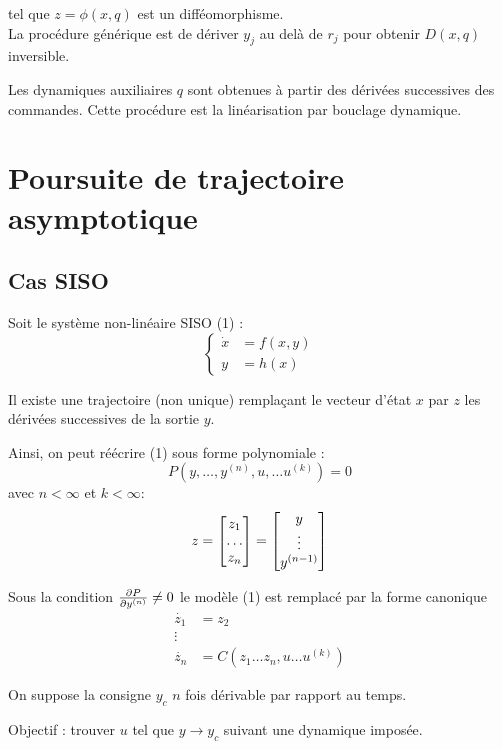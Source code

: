 \documentclass[main.tex]{subfiles}
\begin{document}
tel que $z=\phi(x,q)$ est un difféomorphisme.\\

La procédure générique est de dériver $y_j$ au delà de $r_j$ pour obtenir $D(x,q)$ inversible.

Les dynamiques auxiliaires $q$ sont obtenues à partir des dérivées successives des commandes. Cette procédure est la linéarisation par bouclage dynamique.

\section{Poursuite de trajectoire asymptotique}

\subsection{Cas SISO}
Soit le système non-linéaire SISO (1) :
\[ \begin{cases} \dot{x} & = f(x,y)  \\  y & = h(x) \end{cases} \]

Il existe une trajectoire (non unique) remplaçant le vecteur d'état $x$ par $z$ les dérivées successives de la sortie $y$.

Ainsi, on peut réécrire (1) sous forme polynomiale : 
\[ P(y, \dots, y^{(n)}, u , \dots u^{(k)}) = 0 \] avec $n < \infty$ et $k< \infty$:
\[ z = \vect{ z_1 \\ \dots \\ z_n} = \vect{ y \\ \vdots \\ y^{(n-1)}} \]

Sous la condition $ \derivp[P]{y^{(n)}} \neq 0$ le modèle (1) est remplacé par la forme canonique
\begin{align*}
\dot{z_1} & = z_2\\
\vdots \\
\dot{z_n} & = C(z_1 \dots z_n, u \dots u^{(k)})
\end{align*}

On suppose la consigne $y_c$ $n$ fois dérivable par rapport au temps.

Objectif : trouver $u$ tel que $y \to y_c$ suivant une dynamique imposée.
\end{document}
